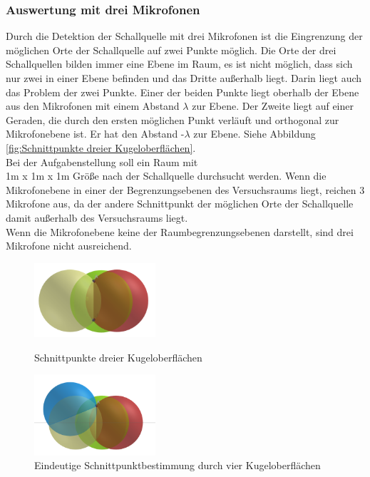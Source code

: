 \subsubsection{Auswertung mit drei Mikrofonen}

Durch die Detektion der Schallquelle mit drei Mikrofonen ist die Eingrenzung der möglichen Orte der Schallquelle auf zwei Punkte möglich. Die Orte der drei Schallquellen bilden immer eine Ebene im Raum, es ist nicht möglich, dass sich nur zwei in einer Ebene befinden und das Dritte außerhalb liegt. Darin liegt auch das Problem der zwei Punkte. Einer der beiden Punkte liegt oberhalb der Ebene aus den Mikrofonen mit einem Abstand $\lambda$ zur Ebene. Der Zweite liegt auf einer Geraden, die durch den ersten möglichen Punkt verläuft und orthogonal zur Mikrofonebene ist. Er hat den Abstand -$\lambda$ zur Ebene. Siehe Abbildung \ref{fig:Schnittpunkte dreier Kugeloberflächen}. \\
Bei der Aufgabenstellung soll ein Raum mit\\ 1m x 1m x 1m Größe nach der Schallquelle durchsucht werden. Wenn die Mikrofonebene in einer der Begrenzungsebenen des Versuchsraums liegt, reichen 3 Mikrofone aus, da der andere Schnittpunkt der möglichen Orte der Schallquelle damit außerhalb des Versuchsraums liegt.\\ Wenn die Mikrofonebene keine der Raumbegrenzungsebenen darstellt, sind drei Mikrofone nicht ausreichend. 
\begin{figure}
\centering 
\includegraphics[width=0.4\textwidth]{3Kugeln}
\caption{Schnittpunkte dreier Kugeloberflächen}\label{fig:Schnittpunkte dreier Kugeloberflächen}
\includegraphics[width=0.4\textwidth]{4Kugeln}
\caption{Eindeutige Schnittpunktbestimmung durch vier Kugeloberflächen}\label{fig:Eindeutige Schnittpunktbestimmung durch vier Kugeloberflächen}
\end{figure}
